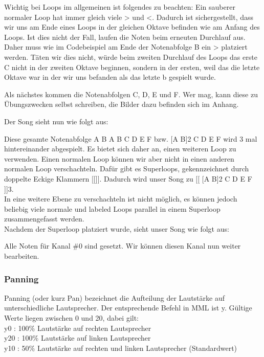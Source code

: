 \medskip

Wichtig bei Loops im allgemeinen ist folgendes zu beachten: Ein sauberer normaler Loop hat immer gleich viele > und <. Dadurch ist sichergestellt, dass wir uns am Ende eines Loops in der gleichen Oktave befinden wie am Anfang des Loops. Ist dies nicht der Fall, laufen die Noten beim erneuten Durchlauf aus. Daher muss wie im Codebeispiel am Ende der Notenabfolge B ein > platziert werden.
Täten wir dies nicht, würde beim zweiten Durchlauf des Loops das erste C nicht in der zweiten Oktave beginnen, sondern in der ersten, weil das die letzte Oktave war in der wir uns befanden als das letzte b gespielt wurde.

\bigskip

Als nächstes kommen die Notenabfolgen C, D, E und F. Wer mag, kann diese zu Übungszwecken selbst schreiben, die Bilder dazu befinden sich im Anhang.

Der Song sieht nun wie folgt aus:

\medskip



\medskip

Diese gesamte Notenabfolge A B A B C D E F bzw. [A B]2 C D E F wird 3 mal hintereinander abgespielt. Es bietet sich daher an, einen weiteren Loop zu verwenden. Einen normalen Loop können wir aber nicht in einen anderen normalen Loop verschachteln. Dafür gibt es Superloops, gekennzeichnet durch doppelte Eckige Klammern [[]].
Dadurch wird unser Song zu [[ [A B]2 C D E F ]]3. \\
In eine weitere Ebene zu verschachteln ist nicht möglich, es können jedoch beliebig viele normale und labeled Loops parallel in einem Superloop zusammengefasst werden. \\
Nachdem der Superloop platziert wurde, sieht unser Song wie folgt aus:

\medskip



\medskip

Alle Noten für Kanal \#0 sind gesetzt. Wir können diesen Kanal nun weiter bearbeiten.

\subsubsection{Panning}
Panning (oder kurz Pan) bezeichnet die Aufteilung der Lautstärke auf unterschiedliche Lautsprecher. Der entsprechende Befehl in MML ist y. Gültige Werte liegen zwischen 0 und 20, dabei gilt: \\
y0 : 100\% Lautstärke auf rechten Lautsprecher \\
y20 : 100\% Lautstärke auf linken Lautsprecher \\
y10 : 50\% Lautstärke auf rechten und linken Lautsprecher (Standardwert) 

